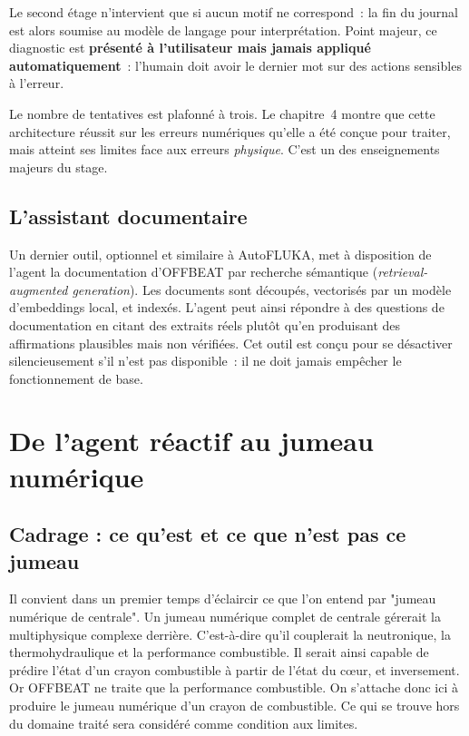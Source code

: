 \documentclass[12pt,a4paper,french]{report}
\begin{document}
Le second étage n'intervient que si aucun motif ne correspond~: la fin du
journal est alors soumise au modèle de langage pour interprétation. Point
majeur, ce diagnostic est \textbf{présenté à l'utilisateur mais jamais
appliqué automatiquement}~: l'humain doit avoir le dernier mot sur des actions sensibles à l'erreur.

Le nombre de tentatives est plafonné à trois. Le chapitre~4 montre que cette
architecture réussit sur les erreurs numériques qu'elle a été conçue pour
traiter, mais atteint ses limites face aux erreurs \textit{physique}. C'est un des enseignements majeurs du stage.

\section{L'assistant documentaire}

Un dernier outil, optionnel et similaire à AutoFLUKA, met à disposition de l'agent la documentation
d'OFFBEAT par recherche sémantique (\textit{retrieval-augmented generation}).
Les documents sont découpés, vectorisés par un modèle d'embeddings local, et
indexés. L'agent peut ainsi répondre à des questions de documentation en citant
des extraits réels plutôt qu'en produisant des affirmations plausibles mais non
vérifiées. Cet outil est conçu pour se désactiver silencieusement s'il n'est pas
disponible~: il ne doit jamais empêcher le fonctionnement de base.

\clearpage

\chapter{De l'agent réactif au jumeau numérique}

\section{Cadrage : ce qu'est et ce que n'est pas ce jumeau}
\label{sec:cadrage}

Il convient dans un premier temps d'éclaircir ce que l'on entend par "jumeau numérique de centrale". Un jumeau
numérique complet de centrale gérerait la multiphysique complexe derrière. C'est-à-dire qu'il couplerait la neutronique, la thermohydraulique et la performance combustible.
Il serait ainsi capable de prédire l'état d'un crayon combustible à partir de l'état du c\oe ur, et inversement. Or OFFBEAT ne
traite que la performance combustible. On s'attache donc ici à produire le jumeau numérique d'un crayon de combustible. Ce qui se trouve hors du domaine traité sera considéré comme condition aux limites.
\end{document}
